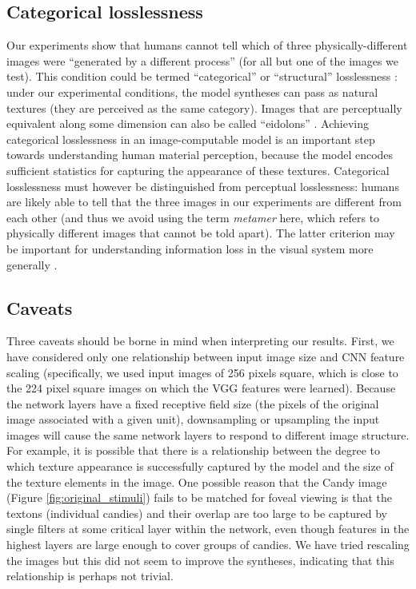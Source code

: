 \documentclass[article, 11pt,a4paper,natbib]{apa6}\usepackage[]{graphicx}\usepackage[]{color}
\begin{document}
\subsection{Categorical losslessness}
Our experiments show that humans cannot tell which of three physically-different images were ``generated by a different process'' (for all but one of the images we test).
This condition could be termed ``categorical'' or ``structural'' losslessness \citep{pappas_rough_2013}: under our experimental conditions, the model syntheses can pass as natural textures (they are perceived as the same category).
Images that are perceptually equivalent along some dimension can also be called ``eidolons'' \citep{koenderink_eidolons:_2017}.
Achieving categorical losslessness in an image-computable model is an important step towards understanding human material perception, because the model encodes sufficient statistics for capturing the appearance of these textures. 
Categorical losslessness must however be distinguished from perceptual losslessness: humans are likely able to tell that the three images in our experiments are different from each other (and thus we avoid using the term \textit{metamer} here, which refers to physically different images that cannot be told apart).
The latter criterion may be important for understanding information loss in the visual system more generally \citep{freeman_metamers_2011, koenderink_metamerism_1996, wallis_testing_2016, wandell_foundations_1995}.

\subsection{Caveats}

Three caveats should be borne in mind when interpreting our results.
First, we have considered only one relationship between input image size and CNN feature scaling (specifically, we used input images of 256 pixels square, which is close to the 224 pixel square images on which the VGG features were learned).
Because the network layers have a fixed receptive field size (the pixels of the original image associated with a given unit),
downsampling or upsampling the input images will cause the same network layers to respond to different image structure.
For example, it is possible that there is a relationship between the degree to which texture appearance is successfully captured by the model and the size of the texture elements in the image.
One possible reason that the Candy image (Figure \ref{fig:original_stimuli}) fails to be matched for foveal viewing is that the textons (individual candies) and their overlap are too large to be captured by single filters at some critical layer within the network, even though features in the highest layers are large enough to cover groups of candies.
We have tried rescaling the images but this did not seem to improve the syntheses, indicating that this relationship is perhaps not trivial.
\end{document}
